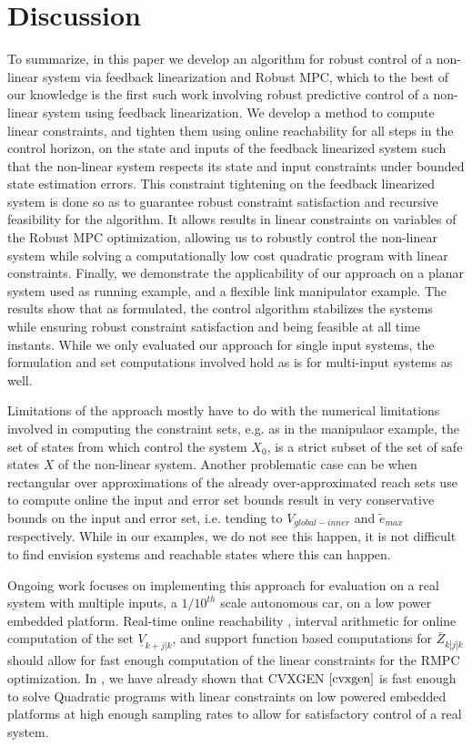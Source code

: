 \section{Discussion}

To summarize, in this paper we develop an algorithm for robust control of a non-linear system via feedback linearization and Robust MPC, which to the best of our knowledge is the first such work involving robust predictive control of a non-linear system using feedback linearization. We develop a method to compute linear constraints, and tighten them using online reachability for all steps in the control horizon, on the state and inputs of the feedback linearized system such that the non-linear system respects its state and input constraints under bounded state estimation errors. This constraint tightening on the feedback linearized system is done so as to guarantee robust constraint satisfaction and recursive feasibility for the algorithm. It allows results in linear constraints on variables of the Robust MPC optimization, allowing us to robustly control the non-linear system while solving a computationally low cost quadratic program with linear constraints. Finally, we demonstrate the applicability of our approach on a planar system used as running example, and a flexible link manipulator example. The results show that as formulated, the control algorithm stabilizes the systems while ensuring robust constraint satisfaction and being feasible at all time instants. While we only evaluated our approach for single input systems, the formulation and set computations involved hold as is for multi-input systems as well.


Limitations of the approach mostly have to do with the numerical limitations involved in computing the constraint sets, e.g. as in the manipulaor example, the set of states from which control the system $X_0$, is a strict subset of the set of safe states $X$ of the non-linear system. Another problematic case can be when rectangular over approximations of the already over-approximated reach sets use to compute online the input and error set bounds result in very conservative bounds on the input and error set, i.e. tending to $V_{global-inner}$ and $\tilde{e}_{max}$ respectively. While in our examples, we do not see this happen, it is not difficult to find envision systems and reachable states where this can happen. 


Ongoing work focuses on implementing this approach for evaluation on a real system with multiple inputs, a $1/10^{th}$ scale autonomous car, on a low power embedded platform. Real-time online reachability \cite{rtreach}, interval arithmetic for online computation of the set $\underline{V}_{k+j|k}$, and support function based computations for $\bar{Z}_{k|j|k}$ should allow for fast enough computation of the linear constraints for the RMPC optimization. In \cite{PantAMNDM15_Anytime}, we have already shown that CVXGEN $\cite{cvxgen}$ is fast enough to solve Quadratic programs with linear constraints on low powered embedded platforms at high enough sampling rates to allow for satisfactory control of a real system.


